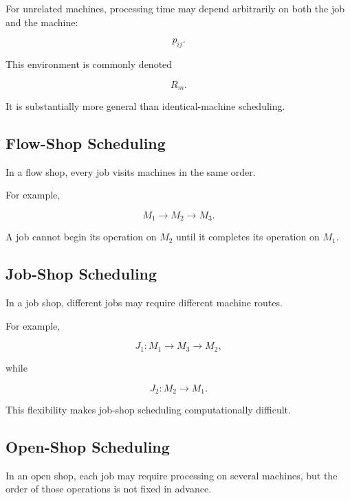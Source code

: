 For unrelated machines, processing time may depend arbitrarily on both the
job and the machine:

\[
\boxed{
p_{ij}.
}
\]

This environment is commonly denoted

\[
\boxed{
R_m.
}
\]

It is substantially more general than identical-machine scheduling.

\subsection{Flow-Shop Scheduling}
\label{subsec:flow-shop-scheduling}

In a flow shop, every job visits machines in the same order.

For example,

\[
\boxed{
M_1
\to
M_2
\to
M_3.
}
\]

A job cannot begin its operation on \(M_2\) until it completes its
operation on \(M_1\).

\subsection{Job-Shop Scheduling}
\label{subsec:job-shop-scheduling}

In a job shop, different jobs may require different machine routes.

For example,

\[
J_1:
M_1
\to
M_3
\to
M_2,
\]

while

\[
J_2:
M_2
\to
M_1.
\]

This flexibility makes job-shop scheduling computationally difficult.

\subsection{Open-Shop Scheduling}
\label{subsec:open-shop-scheduling}

In an open shop, each job may require processing on several machines, but
the order of those operations is not fixed in advance.

